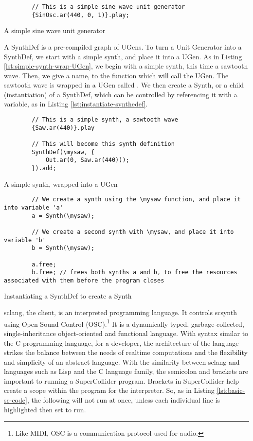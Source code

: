 \begin{listing}
	\begin{lstlisting}
		// This is a simple sine wave unit generator
		{SinOsc.ar(440, 0, 1)}.play;
	\end{lstlisting}
	\caption{A simple sine wave unit generator}
	\label{lst:sine-wave-ug}
\end{listing}

A SynthDef is a pre-compiled graph of UGens. To turn a Unit Generator into a SynthDef, we start with a simple synth, and place it into a UGen. As in Listing \ref{lst:simple-synth-wrap-UGen}, we begin with a simple synth, this time a sawtooth wave. Then, we give a name, \mysaw to the function which will call the UGen. The sawtooth wave is wrapped in a UGen called . We then create a Synth, or a child (instantiation) of a SynthDef, which can be controlled by referencing it with a variable, as in Listing \ref{lst:instantiate-synthedef}\cite{McCartney_2021}.

\begin{listing}
	\begin{lstlisting}
		// This is a simple synth, a sawtooth wave
		{Saw.ar(440)}.play
		
		// This will become this synth definition
		SynthDef(\mysaw, {
			Out.ar(0, Saw.ar(440)));
		}).add;
	\end{lstlisting}
	\caption{A simple synth, wrapped into a UGen}
	\label{lst:simple-synth-wrap-UGen}
\end{listing}

\begin{listing}
	\begin{lstlisting}
		// We create a synth using the \mysaw function, and place it into variable 'a'
		a = Synth(\mysaw);
		
		// We create a second synth with \mysaw, and place it into variable 'b'
		b = Synth(\mysaw);
		
		a.free;
		b.free; // frees both synths a and b, to free the resources associated with them before the program closes
	\end{lstlisting}
	\caption{Instantiating a SynthDef to create a Synth}
	\label{lst:instantiate-synthedef}
\end{listing}

sclang, the client, is an interpreted programming language. It controls scsynth using Open Sound Control (OSC).\footnote{Like MIDI, OSC is a communication protocol used for audio.} It is a dynamically typed, garbage-collected, single-inheritance object-oriented and functional language\cite{McCartney_2021}. With syntax similar to the C programming language, for a developer, the architecture of the language strikes the balance between the needs of realtime computations and the flexibility and simplicity of an abstract language. With the similarity between sclang and languages such as Lisp and the C language family, the semicolon and brackets are important to running a SuperCollider program. Brackets in SuperCollider help create a scope within the program for the interpreter. So, as in Listing \ref{lst:basic-sc-code}, the following will not run at once, unless each individual line is highlighted then set to run.

